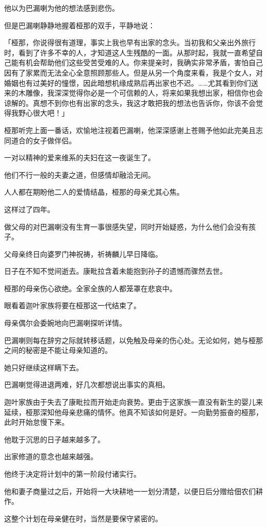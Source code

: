 \documentclass[twoside,openany]{book}
\begin{document}
他以为巴漏喇为他的想法感到悲伤。

但是巴漏喇静静地握着桠那的双手，平静地说：

「桠那，你说得很有道理，事实上我也早有出家的念头。当初我和父亲出外旅行时，看到了许多不幸的人，才知道这人生残酷的一面。从那时起，我就一直希望自己能有机会帮助他们这些受苦受难的人。你来提亲时，我确实非常矛盾，害怕自己因有了家累而无法全心全意照顾那些人。但是从另一个角度来看，我是个女人，对婚姻也有过美好的憧憬，因此暗想机缘成熟后再出家也不迟。……尤其看到你们送来的木雕像，我深深觉得你必是一个可信赖的人，将来如果我想出家，相信你也会谅解的。真想不到你也有出家的念头，我这才敢把我的想法也告诉你，你该不会觉得我野心很大吧！」

桠那听完上面一番话，欢愉地注视着巴漏喇，他深深感谢上苍赐予他如此完美且志同道合的女子做伴侣。

一对以精神的爱来维系的夫妇在这一夜诞生了。

他们不行一般的夫妻之道，但感情却融洽无间。

人人都在期盼他二人的爱情结晶，桠那的母亲尤其心焦。

这样过了四年。

做父母的对巴漏喇没有生育一事很感失望，同时开始疑惑，为什么他们会没有孩子。

父母亲终日向婆罗门神祝祷，祈祷麟儿早日降临。

日子在不知不觉间逝去。康毗拉含着未能抱到孙子的遗憾而骤然去世。

桠那的母亲伤心欲绝。全家全族的人都笼罩在悲哀中。

眼看着迦叶家族将要在桠那这一代结束了。

母亲偶尔会委婉地向巴漏喇探听详情。

巴漏喇则每在辞穷之际就转移话题，以免触及母亲的伤心处。无论如何，她与桠那之间的秘密是不能让母亲知道的。

她只好继续这样瞒下去。

巴漏喇觉得进退两难，好几次都想说出事实的真相。

迦叶家族由于失去了康毗拉而开始走向衰势。更由于这家族一直没有新生的婴儿来延续，桠那深知他母亲悲痛的情怀。他真不知该如何是好。一向勤劳振奋的桠那，此时开始怠慢下来。

他耽于沉思的日子越来越多了。

出家修道的意念也越来越强。

他终于决定将计划中的第一阶段付诸实行。

他和妻子商量过之后，开始将一大块耕地一一划分清楚，以便日后分赠给佃农们耕作。

这整个计划在母亲健在时，当然是要保守紧密的。
\end{document}
